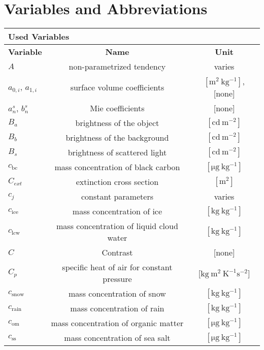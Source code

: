
\section{Variables and Abbreviations}

\begin{longtable}[H]{|l|c|c|}
\hline 
\multicolumn{3}{|l|}{\textbf{Used Variables}}\\
\hline 
\textbf{Variable} &\textbf{Name} & \textbf{Unit} \\ 


\hline
$A$ & non-parametrized tendency & varies\\
\hline
$a_{0,i}$, $a_{1,i}$ & surface volume coefficients & $ \left[ \mathrm{ m^{2} \ kg^{-1}} \right]$, [none] \\
    \hline
$a^{s}_{n}$, $b^{s}_{n}$ & Mie coefficients& [none]\\
\hline
$B_{a}$ &brightness of the object& $ \left[ \mathrm{cd \ m^{-2}} \right] $\\
\hline
$B_{b}$ &brightness of the background & $ \left[ \mathrm{cd\  m^{-2}} \right] $\\
\hline
$B_{s}$ &brightness of scattered light & $ \left[ \mathrm{cd\  m^{-2}} \right] $\\
\hline
$c_{\mathrm{bc}}$ &mass concentration of black carbon & $ \left[ \mathrm{\mu g \ kg^{-1}} \right] $\\
\hline 
$C_{ext}$ &extinction cross section & $ \left[ \mathrm{m^{2}} \right] $\\
\hline
$c_{j}$ &constant parameters & varies\\
\hline 
$c_{\mathrm{ice}}$ &mass concentration of ice & $\left[\mathrm{ kg \ kg^{-1} }\right]$\\
\hline
$c_{\mathrm{lcw}}$ &mass concentration of liquid cloud water&$\left[\mathrm{ kg \ kg^{-1} }\right]$\\
\hline
$C$ & Contrast &[none]\\
\hline
$C_{p}$ &specific heat of air for constant pressure&[$\mathrm{ kg\ m^{2}\ 
K^{-1} s^{-2} }$]\\
\hline
$c_{\mathrm{snow}}$ &mass concentration of snow & $\left[\mathrm{ kg \ kg^{-1} }\right]$\\
\hline
$c_{\mathrm{rain}}$ &mass concentration of rain &$\left[\mathrm{ kg \ kg^{-1} }\right]$\\
\hline
$c_{\mathrm{om}}$ &mass concentration of organic matter & $ \left[ \mathrm{\mu g \ kg^{-1}} \right] $\\
\hline
$c_{\mathrm{ss}}$ &mass concentration of sea salt &  $ \left[ \mathrm{\mu g \ kg^{-1}} \right] $\\

\end{longtable}
